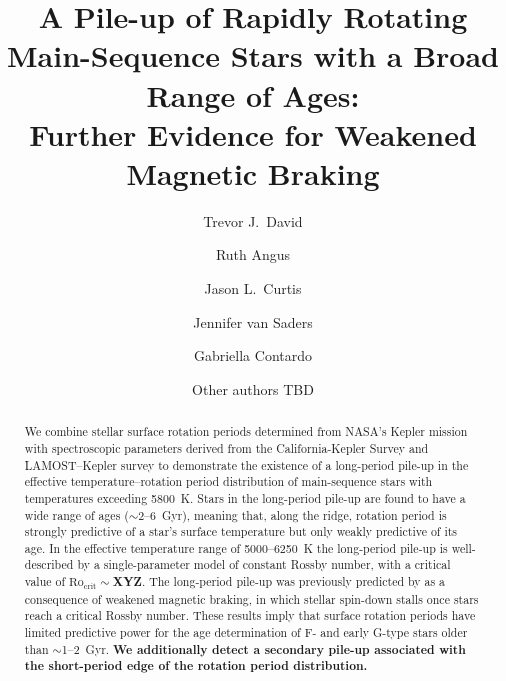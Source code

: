 \documentclass[linenumbers,tighten,trackchanges,twocolumn]{aastex631}
\begin{document}
\title{A Pile-up of Rapidly Rotating Main-Sequence Stars with a Broad Range of Ages: \\Further Evidence for Weakened Magnetic Braking}


\author[0000-0001-6534-6246]{Trevor J.\ David}

\author[0000-0003-4540-5661]{Ruth Angus}

\author[0000-0002-2792-134X]{Jason L.~Curtis}

\author[0000-0002-4284-8638]{Jennifer van Saders}

\author[0000-0002-3011-4784]{Gabriella Contardo}

\author{Other authors TBD}



\begin{abstract}
We combine stellar surface rotation periods determined from NASA's Kepler mission with spectroscopic parameters derived from the California-Kepler Survey and LAMOST--Kepler survey to demonstrate the existence of a long-period pile-up in the effective temperature--rotation period distribution of main-sequence stars with temperatures exceeding 5800~K. Stars in the long-period pile-up are found to have a wide range of ages ($\sim$2--6~Gyr), meaning that, along the ridge, rotation period is strongly predictive of a star's surface temperature but only weakly predictive of its age. In the effective temperature range of 5000--6250~K the long-period pile-up is well-described by a single-parameter model of constant Rossby number, with a critical value of $\mathrm{Ro_{crit}} \sim$\textbf{XYZ}. The long-period pile-up was previously predicted by \citet{vanSaders2019} as a consequence of weakened magnetic braking, in which stellar spin-down stalls once stars reach a critical Rossby number. These results imply that surface rotation periods have limited predictive power for the age determination of F- and early G-type stars older than $\sim$1--2~Gyr. \textbf{We additionally detect a secondary pile-up associated with the short-period edge of the rotation period distribution.}
\end{abstract}
\end{document}
